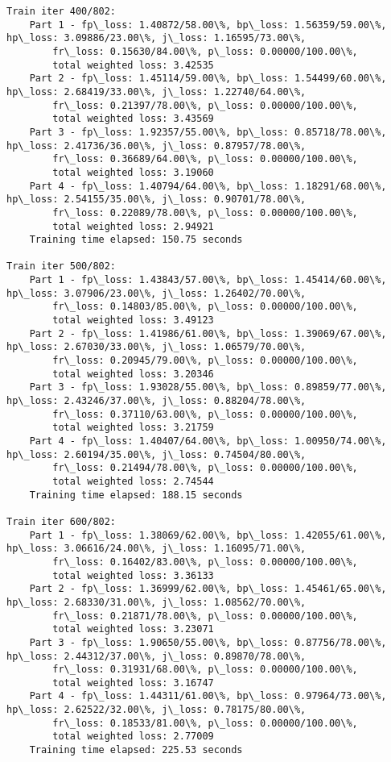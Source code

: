 \documentclass[11pt]{article}
\begin{document}
\begin{Verbatim}[commandchars=\\\{\}]
Train iter 400/802:
	Part 1 - fp\_loss: 1.40872/58.00\%, bp\_loss: 1.56359/59.00\%, hp\_loss: 3.09886/23.00\%, j\_loss: 1.16595/73.00\%, 
		fr\_loss: 0.15630/84.00\%, p\_loss: 0.00000/100.00\%, 
		total weighted loss: 3.42535
	Part 2 - fp\_loss: 1.45114/59.00\%, bp\_loss: 1.54499/60.00\%, hp\_loss: 2.68419/33.00\%, j\_loss: 1.22740/64.00\%, 
		fr\_loss: 0.21397/78.00\%, p\_loss: 0.00000/100.00\%, 
		total weighted loss: 3.43569
	Part 3 - fp\_loss: 1.92357/55.00\%, bp\_loss: 0.85718/78.00\%, hp\_loss: 2.41736/36.00\%, j\_loss: 0.87957/78.00\%, 
		fr\_loss: 0.36689/64.00\%, p\_loss: 0.00000/100.00\%, 
		total weighted loss: 3.19060
	Part 4 - fp\_loss: 1.40794/64.00\%, bp\_loss: 1.18291/68.00\%, hp\_loss: 2.54155/35.00\%, j\_loss: 0.90701/78.00\%, 
		fr\_loss: 0.22089/78.00\%, p\_loss: 0.00000/100.00\%, 
		total weighted loss: 2.94921
	Training time elapsed: 150.75 seconds

Train iter 500/802:
	Part 1 - fp\_loss: 1.43843/57.00\%, bp\_loss: 1.45414/60.00\%, hp\_loss: 3.07906/23.00\%, j\_loss: 1.26402/70.00\%, 
		fr\_loss: 0.14803/85.00\%, p\_loss: 0.00000/100.00\%, 
		total weighted loss: 3.49123
	Part 2 - fp\_loss: 1.41986/61.00\%, bp\_loss: 1.39069/67.00\%, hp\_loss: 2.67030/33.00\%, j\_loss: 1.06579/70.00\%, 
		fr\_loss: 0.20945/79.00\%, p\_loss: 0.00000/100.00\%, 
		total weighted loss: 3.20346
	Part 3 - fp\_loss: 1.93028/55.00\%, bp\_loss: 0.89859/77.00\%, hp\_loss: 2.43246/37.00\%, j\_loss: 0.88204/78.00\%, 
		fr\_loss: 0.37110/63.00\%, p\_loss: 0.00000/100.00\%, 
		total weighted loss: 3.21759
	Part 4 - fp\_loss: 1.40407/64.00\%, bp\_loss: 1.00950/74.00\%, hp\_loss: 2.60194/35.00\%, j\_loss: 0.74504/80.00\%, 
		fr\_loss: 0.21494/78.00\%, p\_loss: 0.00000/100.00\%, 
		total weighted loss: 2.74544
	Training time elapsed: 188.15 seconds

Train iter 600/802:
	Part 1 - fp\_loss: 1.38069/62.00\%, bp\_loss: 1.42055/61.00\%, hp\_loss: 3.06616/24.00\%, j\_loss: 1.16095/71.00\%, 
		fr\_loss: 0.16402/83.00\%, p\_loss: 0.00000/100.00\%, 
		total weighted loss: 3.36133
	Part 2 - fp\_loss: 1.36999/62.00\%, bp\_loss: 1.45461/65.00\%, hp\_loss: 2.68330/31.00\%, j\_loss: 1.08562/70.00\%, 
		fr\_loss: 0.21871/78.00\%, p\_loss: 0.00000/100.00\%, 
		total weighted loss: 3.23071
	Part 3 - fp\_loss: 1.90650/55.00\%, bp\_loss: 0.87756/78.00\%, hp\_loss: 2.44312/37.00\%, j\_loss: 0.89870/78.00\%, 
		fr\_loss: 0.31931/68.00\%, p\_loss: 0.00000/100.00\%, 
		total weighted loss: 3.16747
	Part 4 - fp\_loss: 1.44311/61.00\%, bp\_loss: 0.97964/73.00\%, hp\_loss: 2.62522/32.00\%, j\_loss: 0.78175/80.00\%, 
		fr\_loss: 0.18533/81.00\%, p\_loss: 0.00000/100.00\%, 
		total weighted loss: 2.77009
	Training time elapsed: 225.53 seconds


\end{Verbatim}
\end{document}
